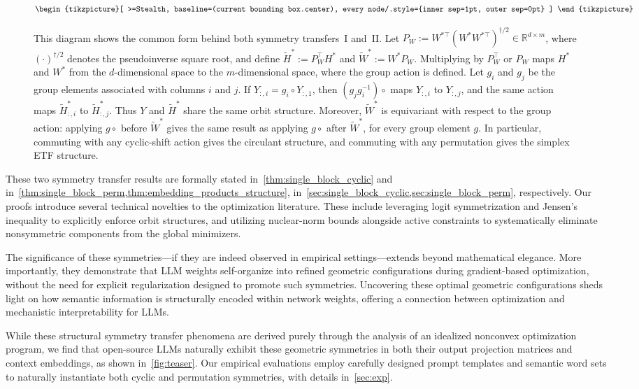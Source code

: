 \documentclass[11pt]{article}
\begin{document}
\begin{figure}[ht]
\[\begin{tikzpicture}[
  >=Stealth,
  baseline=(current bounding box.center),
  every node/.style={inner sep=1pt, outer sep=0pt}
]
\end{tikzpicture}
\]
\caption{This diagram shows the common form behind both symmetry transfers~I and~II. Let
\(P_W:=W^{*\top}(W^*W^{*\top})^{\dagger/2}\in\mathbb R^{d\times m}\), where \((\cdot)^{\dagger/2}\) denotes the pseudoinverse square root, and define \(\widetilde H^*:=P_W^\top H^*\) and \(\widetilde W^*:=W^*P_W\). Multiplying by \(P_W^\top\) or \(P_W\) maps \(H^*\) and \(W^*\) from the \(d\)-dimensional space to the \(m\)-dimensional space, where the group action is defined. Let \(g_i\) and \(g_j\) be the group elements associated with columns \(i\) and \(j\). If \(Y_{:,i}=g_i\circ Y_{:,1}\), then \((g_jg_i^{-1})\circ\) maps \(Y_{:,i}\) to \(Y_{:,j}\), and the same action maps \(\widetilde H^*_{:,i}\) to \(\widetilde H^*_{:,j}\). Thus \(Y\) and \(\widetilde H^*\) share the same orbit structure. Moreover, \(\widetilde W^*\) is equivariant with respect to the group action: applying \(g\circ\) before \(\widetilde W^*\) gives the same result as applying \(g\circ\) after \(\widetilde W^*\), for every group element \(g\). In particular, commuting with any cyclic-shift action gives the circulant structure, and commuting with any permutation gives the simplex ETF structure.}
\end{figure}

These two symmetry transfer results are formally stated in~\cref{thm:single_block_cyclic} and in~\cref{thm:single_block_perm,thm:embedding_products_structure}, in~\cref{sec:single_block_cyclic,sec:single_block_perm}, respectively. Our proofs introduce several technical novelties to the optimization literature. These include leveraging logit symmetrization and Jensen's inequality to explicitly enforce orbit structures, and utilizing nuclear-norm bounds alongside active constraints to systematically eliminate nonsymmetric components from the global minimizers.

The significance of these symmetries---if they are indeed observed in empirical settings---extends beyond mathematical elegance. More importantly, they demonstrate that LLM weights self-organize into refined geometric configurations during gradient-based optimization, without the need for explicit regularization designed to promote such symmetries. Uncovering these optimal geometric configurations sheds light on how semantic information is structurally encoded within network weights, offering a connection between optimization and mechanistic interpretability for LLMs.

While these structural symmetry transfer phenomena are derived purely through the analysis of an idealized nonconvex optimization program, we find that open-source LLMs naturally exhibit these geometric symmetries in both their output projection matrices and context embeddings, as shown in~\cref{fig:teaser}. Our empirical evaluations employ carefully designed prompt templates and semantic word sets to naturally instantiate both cyclic and permutation symmetries, with details in~\cref{sec:exp}. 
\end{document}
